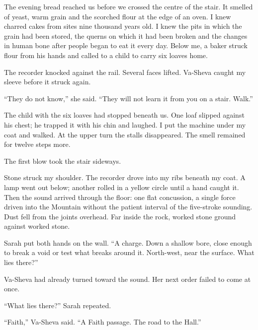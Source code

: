 The evening bread reached us before we crossed the centre of the stair. It smelled of yeast, warm grain and the scorched flour at the edge of an oven. I knew charred cakes from sites nine thousand years old. I knew the pits in which the grain had been stored, the querns on which it had been broken and the changes in human bone after people began to eat it every day. Below me, a baker struck flour from his hands and called to a child to carry six loaves home.\par

The recorder knocked against the rail. Several faces lifted. Va-Sheva caught my sleeve before it struck again.\par

``They do not know,'' she said. ``They will not learn it from you on a stair. Walk.''\par

The child with the six loaves had stopped beneath us. One loaf slipped against his chest; he trapped it with his chin and laughed. I put the machine under my coat and walked. At the upper turn the stalls disappeared. The smell remained for twelve steps more.\par

\ornament

The first blow took the stair sideways.\par

Stone struck my shoulder. The recorder drove into my ribs beneath my coat. A lamp went out below; another rolled in a yellow circle until a hand caught it. Then the sound arrived through the floor: one flat concussion, a single force driven into the Mountain without the patient interval of the five-stroke sounding. Dust fell from the joints overhead. Far inside the rock, worked stone ground against worked stone.\par

Sarah put both hands on the wall. ``A charge. Down a shallow bore, close enough to break a void or test what breaks around it. North-west, near the surface. What lies there?''\par

Va-Sheva had already turned toward the sound. Her next order failed to come at once.\par

``What lies there?'' Sarah repeated.\par

``Faith,'' Va-Sheva said. ``A Faith passage. The road to the Hall.''\par

